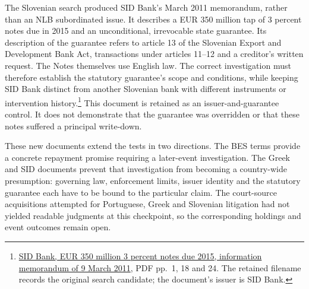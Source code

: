 The Slovenian search produced SID Bank's March 2011 memorandum, rather than
an NLB subordinated issue. It describes a EUR 350 million tap of 3 percent
notes due in 2015 and an unconditional, irrevocable state guarantee. Its
description of the guarantee refers to article 13 of the Slovenian Export
and Development Bank Act, transactions under articles 11--12 and a creditor's
written request. The Notes themselves use English law. The correct
investigation must therefore establish the statutory guarantee's scope and
conditions, while keeping SID Bank distinct from another Slovenian bank
with different instruments or intervention history.\footnote{
\href{../prospectus/jurisdiction-2026-10-04/sources/jur-nlb-2011-candidate/source.pdf}
{SID Bank, EUR 350 million 3 percent notes due 2015, information memorandum
of 9 March 2011}, PDF pp.~1, 18 and 24. The retained filename records the
original search candidate; the document's issuer is SID Bank.}
This document is retained as an issuer-and-guarantee control. It does not
demonstrate that the guarantee was overridden or that these notes suffered
a principal write-down.

These new documents extend the tests in two directions. The BES terms
provide a concrete repayment promise requiring a later-event investigation.
The Greek and SID documents prevent that investigation from becoming a
country-wide presumption: governing law, enforcement limits, issuer identity
and the statutory guarantee each have to be bound to the particular claim.
The court-source acquisitions attempted for Portuguese, Greek and Slovenian
litigation had not yielded readable judgments at this checkpoint, so the
corresponding holdings and event outcomes remain open.
